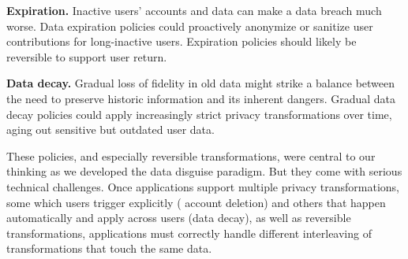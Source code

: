 
\textbf{Expiration.}
%
Inactive users' accounts and data can make a data breach much worse.
%
Data expiration policies could proactively anonymize or sanitize user
contributions for long-inactive users.
%
Expiration policies should likely be reversible to support user return.
%

\textbf{Data decay.}
%
Gradual loss of fidelity in old data might strike a balance between the need
to preserve historic information and its inherent dangers.
%
Gradual data decay policies could apply increasingly strict privacy
transformations over time, aging out sensitive but outdated user data.
%

%
These policies, and especially reversible transformations, were central to our
thinking as we developed the data disguise paradigm.
%
But they come with serious technical challenges. Once applications support
multiple privacy trans\-form\-ations, some which users trigger explicitly (\eg
account deletion) and others that happen automatically and apply across users
(\eg data decay), as well as reversible transformations, applications must correctly
handle different interleaving of transformations that touch the same data.
%


